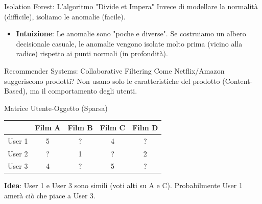 \documentclass[aspectratio=169, 10pt]{beamer}
\begin{document}
\begin{frame}{Isolation Forest: L'algoritmo "Divide et Impera"}
    Invece di modellare la normalità (difficile), isoliamo le anomalie (facile).
    
    \begin{itemize}
        \item \textbf{Intuizione}: Le anomalie sono "poche e diverse". Se costruiamo un albero decisionale casuale, le anomalie vengono isolate molto prima (vicino alla radice) rispetto ai punti normali (in profondità).
    \end{itemize}
    
    \centering
\end{frame}

\begin{frame}{Recommender Systems: Collaborative Filtering}
    Come Netflix/Amazon suggeriscono prodotti? Non usano solo le caratteristiche del prodotto (Content-Based), ma il comportamento degli utenti.
    
    \begin{block}{Matrice Utente-Oggetto (Sparsa)}
        \centering
        \begin{tabular}{c|cccc}
             & Film A & Film B & Film C & Film D \\ \hline
            User 1 & 5 & ? & 4 & ? \\
            User 2 & ? & 1 & ? & 2 \\
            User 3 & 4 & ? & 5 & ? \\
        \end{tabular}
    \end{block}
    
    \textbf{Idea}: User 1 e User 3 sono simili (voti alti su A e C). Probabilmente User 1 amerà ciò che piace a User 3.
\end{frame}
\end{document}

